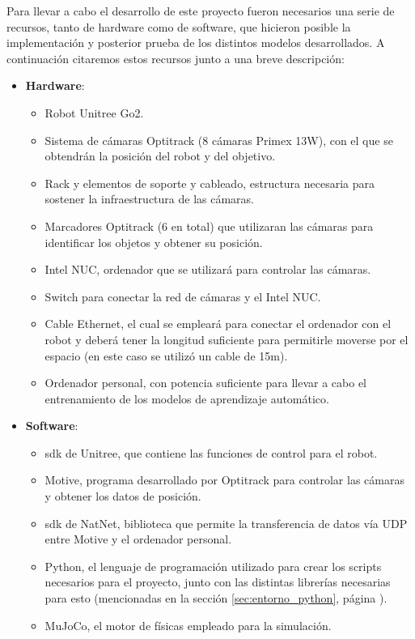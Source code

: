 Para llevar a cabo el desarrollo de este proyecto fueron necesarios una serie de recursos, tanto de hardware como de software, que hicieron 
posible la implementación y posterior prueba de los distintos modelos desarrollados. A continuación citaremos estos recursos junto a una breve 
descripción: 

\begin{itemize}
    \item \textbf{Hardware}:
    
    \begin{itemize}
        \item Robot Unitree Go2. 
        \item Sistema de cámaras Optitrack (8 cámaras Primex 13W), con el que se obtendrán la posición del robot y del objetivo.
        \item Rack y elementos de soporte y cableado, estructura necesaria para sostener la infraestructura de las cámaras.
        \item Marcadores Optitrack (6 en total) que utilizaran las cámaras para identificar los objetos y obtener su posición.
        \item Intel NUC, ordenador que se utilizará para controlar las cámaras.
        \item Switch para conectar la red de cámaras y el Intel NUC.
        \item Cable Ethernet, el cual se empleará para conectar el ordenador con el robot y deberá tener la longitud suficiente para 
        permitirle moverse por el espacio (en este caso se utilizó un cable de 15m).
        \item Ordenador personal, con potencia suficiente para llevar a cabo el entrenamiento de los modelos de aprendizaje automático.
    \end{itemize}
    \item \textbf{Software}:

    \begin{itemize}
        \item \Gls{sdk} de Unitree, que contiene las funciones de control para el robot. 
        \item Motive, programa desarrollado por Optitrack para controlar las cámaras y obtener los datos de posición.
        \item \Gls{sdk} de NatNet, biblioteca que permite la transferencia de datos vía UDP entre Motive y el ordenador personal.
        \item Python, el lenguaje de programación utilizado para crear los scripts necesarios para el proyecto, junto con las distintas 
        librerías necesarias para esto (mencionadas en la sección \ref{sec:entorno_python}, página \pageref{sec:entorno_python}).
        \item MuJoCo, el motor de físicas empleado para la simulación.
    \end{itemize}
    
\end{itemize}


